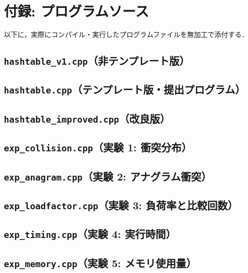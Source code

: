 \section{付録: プログラムソース}

以下に，実際にコンパイル・実行したプログラムファイルを無加工で添付する．

\subsection{{\tt hashtable\_v1.cpp}（非テンプレート版）}
{\scriptsize}

\subsection{{\tt hashtable.cpp}（テンプレート版・提出プログラム）}
{\scriptsize}

\subsection{{\tt hashtable\_improved.cpp}（改良版）}
{\scriptsize}

\subsection{{\tt exp\_collision.cpp}（実験 1: 衝突分布）}
{\scriptsize}

\subsection{{\tt exp\_anagram.cpp}（実験 2: アナグラム衝突）}
{\scriptsize}

\subsection{{\tt exp\_loadfactor.cpp}（実験 3: 負荷率と比較回数）}
{\scriptsize}

\subsection{{\tt exp\_timing.cpp}（実験 4: 実行時間）}
{\scriptsize}

\subsection{{\tt exp\_memory.cpp}（実験 5: メモリ使用量）}
{\scriptsize}

